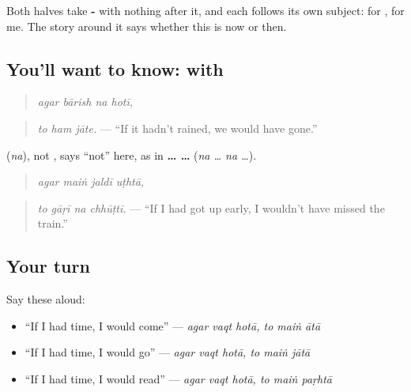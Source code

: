 Both halves take \textbf{-} with nothing after it, and each follows its own subject: \textbf{} for \textbf{}, \textbf{} for me. The story around it says whether this is now or then.

\subsection*{You'll want to know: with }
\begin{quote}
\textbf{   }
\end{quote}

\begin{quote}
\emph{agar bārish na hotī,}
\end{quote}

\begin{quote}
\textbf{  }
\end{quote}

\begin{quote}
\emph{to ham jāte.} — \textquotedblleft{}If it hadn't rained, we would have gone.\textquotedblright{}
\end{quote}

\textbf{} (\emph{na}), not \textbf{}, says \textquotedblleft{}not\textquotedblright{} here, as in \textbf{ …  …} (\emph{na … na …}).

\begin{quote}
\textbf{   }
\end{quote}

\begin{quote}
\emph{agar maiṅ jaldī uṭhtā,}
\end{quote}

\begin{quote}
\textbf{   }
\end{quote}

\begin{quote}
\emph{to gāṛī na chhūṭtī.} — \textquotedblleft{}If I had got up early, I wouldn't have missed the train.\textquotedblright{}
\end{quote}

\subsection*{Your turn}
Say these aloud:

\begin{itemize}
\raggedright
  \item \textquotedblleft{}If I had time, I would come\textquotedblright{} — \emph{agar vaqt hotā, to maiṅ ātā}
  \item \textquotedblleft{}If I had time, I would go\textquotedblright{} — \emph{agar vaqt hotā, to maiṅ jātā}
  \item \textquotedblleft{}If I had time, I would read\textquotedblright{} — \emph{agar vaqt hotā, to maiṅ paṛhtā}
\end{itemize}

